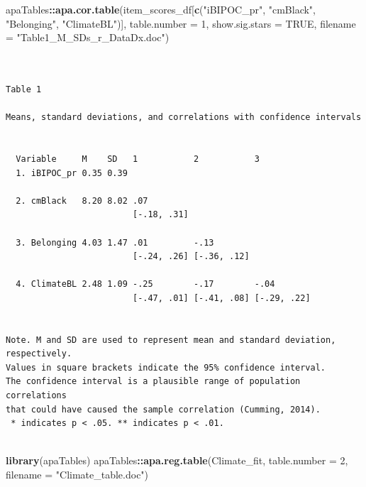 \documentclass[
  11pt,
]{book}
\newenvironment{Shaded}{\begin{snugshade}}{\end{snugshade}}
\newcommand{\AttributeTok}[1]{\textcolor[rgb]{0.27,0.27,0.27}{#1}}
\newcommand{\ConstantTok}[1]{\textcolor[rgb]{0.37,0.37,0.37}{#1}}
\newcommand{\DecValTok}[1]{\textcolor[rgb]{0.06,0.06,0.06}{#1}}
\newcommand{\FunctionTok}[1]{\textcolor[rgb]{0.27,0.27,0.27}{\textbf{#1}}}
\newcommand{\NormalTok}[1]{#1}
\newcommand{\SpecialCharTok}[1]{\textcolor[rgb]{0.43,0.43,0.43}{\textbf{#1}}}
\newcommand{\StringTok}[1]{\textcolor[rgb]{0.5,0.5,0.5}{#1}}
\begin{document}
\begin{Shaded}
\begin{Highlighting}[]
\NormalTok{apaTables}\SpecialCharTok{::}\FunctionTok{apa.cor.table}\NormalTok{(item\_scores\_df[}\FunctionTok{c}\NormalTok{(}\StringTok{"iBIPOC\_pr"}\NormalTok{, }\StringTok{"cmBlack"}\NormalTok{, }\StringTok{"Belonging"}\NormalTok{,}
    \StringTok{"ClimateBL"}\NormalTok{)], }\AttributeTok{table.number =} \DecValTok{1}\NormalTok{, }\AttributeTok{show.sig.stars =} \ConstantTok{TRUE}\NormalTok{, }\AttributeTok{filename =} \StringTok{"Table1\_M\_SDs\_r\_DataDx.doc"}\NormalTok{)}
\end{Highlighting}
\end{Shaded}

\begin{verbatim}


Table 1 

Means, standard deviations, and correlations with confidence intervals
 

  Variable     M    SD   1           2           3          
  1. iBIPOC_pr 0.35 0.39                                    
                                                            
  2. cmBlack   8.20 8.02 .07                                
                         [-.18, .31]                        
                                                            
  3. Belonging 4.03 1.47 .01         -.13                   
                         [-.24, .26] [-.36, .12]            
                                                            
  4. ClimateBL 2.48 1.09 -.25        -.17        -.04       
                         [-.47, .01] [-.41, .08] [-.29, .22]
                                                            

Note. M and SD are used to represent mean and standard deviation, respectively.
Values in square brackets indicate the 95% confidence interval.
The confidence interval is a plausible range of population correlations 
that could have caused the sample correlation (Cumming, 2014).
 * indicates p < .05. ** indicates p < .01.
 
\end{verbatim}

\begin{Shaded}
\begin{Highlighting}[]
\FunctionTok{library}\NormalTok{(apaTables)}
\NormalTok{apaTables}\SpecialCharTok{::}\FunctionTok{apa.reg.table}\NormalTok{(Climate\_fit, }\AttributeTok{table.number =} \DecValTok{2}\NormalTok{, }\AttributeTok{filename =} \StringTok{"Climate\_table.doc"}\NormalTok{)}
\end{Highlighting}
\end{Shaded}
\end{document}

